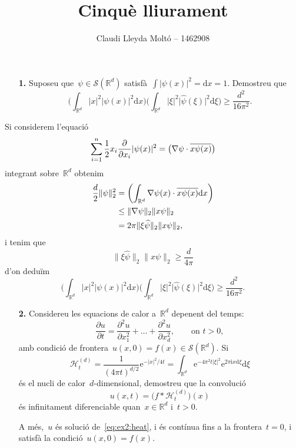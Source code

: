 \documentclass[a4paper]{article}
\title{Cinquè lliurament}
\author{Claudi Lleyda Moltó -- 1462908}
\theoremstyle{plain}
\theoremstyle{definition}
\let\Re\relax
\DeclareMathOperator{\Re}{Re}
\newcommand{\iu}{\mathrm{i}}
\newcommand{\e}{\mathrm{e}}
\providecommand{\uppi}{\pi}
\newcommand{\diff}{\mathrm{d}}
\newcommand{\abs}[1]{\lvert{#1}\rvert}
\newcommand{\Sc}{\mathcal{S}}
\newcommand{\Hk}{\mathcal{H}}
\newcommand{\conjugat}[1]{\overline{#1}}
\newcommand{\norm}[1]{\lVert{#1}\rVert}
\newcommand{\RR}{\mathbb{R}}
\begin{document}
\maketitle

\begin{enumerate}
    \item[\textbf{1.}] Suposeu que~\(\psi\in\Sc(\RR^{d})\)
        satisfà~\(\int\abs{\psi(x)}^{2}=\diff x=1\). Demostreu que
        \[
            \biggl(\int_{\RR^{d}}\abs{x}^{2}\abs{\psi(x)}^{2}\diff x\biggr)
            \biggl(\int_{\RR^{d}}\abs{\xi}^{2}\abs{\widehat{\psi}(\xi)}^{2}\diff\xi\biggr)
            \geq
            \frac{d^{2}}{16\uppi^{2}}.
        \]
\end{enumerate}

Si considerem l'equació
\[
    \sum_{i=1}^{n}
    \frac{1}{2}
    x_{i}
    \frac{\partial}{\partial x_{i}}
    \abs{\psi(x)}^{2}
    =
    \Re\bigl(
        \nabla\psi\cdot\conjugat{x\psi(x)}
    \bigr)
\]
integrant sobre~\(\RR^{d}\) obtenim
\begin{align*}
    \frac{d}{2}
    \norm{\psi}_{2}^{2} &= \Re\biggl(
                           \int_{\RR^{d}}
                           \nabla\psi(x)\cdot\conjugat{x\psi(x)}
                           \diff x
                           \biggr) \\
                        &\leq \norm{\nabla\psi}_{2}
                           \norm{x\psi}_{2} \\
                        &= 2\uppi
                           \norm{\xi\widehat{\psi}}_{2}
                           \norm{x\psi}_{2},
\end{align*}
i tenim que
\[
    \norm{\xi\widehat{\psi}}_{2}
    \norm{x\psi}_{2}
    \geq
    \frac{d}{4\uppi}
\]
d'on deduïm
\[
    \biggl(\int_{\RR^{d}}\abs{x}^{2}\abs{\psi(x)}^{2}\diff x\biggr)
    \biggl(\int_{\RR^{d}}\abs{\xi}^{2}\abs{\widehat{\psi}(\xi)}^{2}\diff\xi\biggr)
    \geq
    \frac{d^{2}}{16\uppi^{2}}.
\]

\begin{enumerate}
    \item[\textbf{2.}] Considereu les equacions de calor a~\(\RR^{d}\) depenent
        del temps:
    \begin{equation}
        \label{eq:ex2:heat}
        \frac{\partial u}{\partial t}
        =
        \frac{\partial^{2}u}{\partial x_{1}^{2}}
        + \dots +
        \frac{\partial^{2}u}{\partial x_{d}^{2}},
        \qquad
        \text{on }
        t>0,
    \end{equation}
    amb condició de frontera~\(u(x,0)=f(x)\in\Sc(\RR^{d})\).
    Si
    \[
        \Hk_{t}^{(d)}
        =
        \frac{1}{(4\uppi t)^{d/2}}
        \e^{-\abs{x}^{2}/4t}
        =
        \int_{\RR^{d}}
        \e^{-4\uppi^{2}t\abs{\xi}^{2}}
        \e^{2\uppi\iu x\diff\xi}
        \diff\xi
    \]
    és el nucli de calor~\(d\)-dimensional, demostreu que la convolució
    \[
        u(x,t)
        =
        \bigl(f\ast\Hk_{t}^{(d)}\bigr)(x)
    \]
    és infinitament diferenciable quan~\(x\in\RR^{d}\) i~\(t>0\).

    A més,~\(u\) és solució de~\eqref{eq:ex2:heat},
    i és contínua fins a la frontera~\(t=0\),
    i satisfà la condició~\(u(x,0)=f(x)\).
\end{enumerate}
\end{document}

